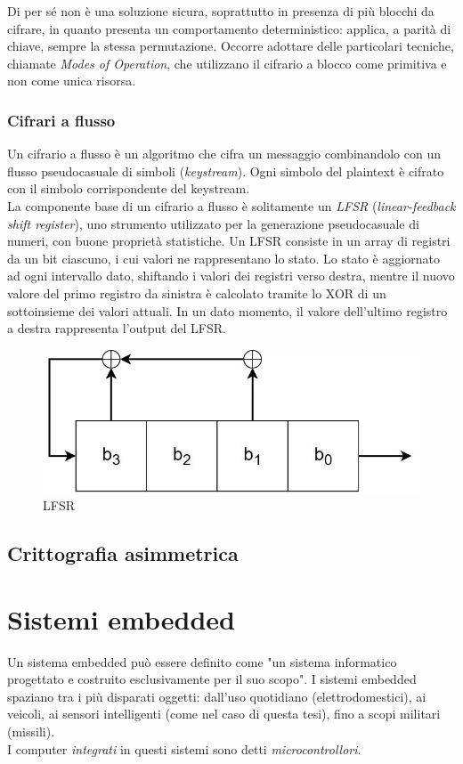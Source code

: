 \documentclass[target=bach,aauheader=,style=]{thud}
\begin{document}
            Di per sé non è una soluzione sicura, soprattutto in presenza di più blocchi da cifrare, in quanto presenta un comportamento deterministico: applica, a parità di chiave, sempre la stessa permutazione. Occorre adottare delle particolari tecniche, chiamate \textit{Modes of Operation}, che utilizzano il cifrario a blocco come primitiva e non come unica risorsa. \cite{handcypto, computernet}
            
            \subsubsection{Cifrari a flusso}
            Un cifrario a flusso è un algoritmo che cifra un messaggio combinandolo con un flusso pseudocasuale di simboli (\textit{keystream}). Ogni simbolo del plaintext è cifrato con il simbolo corrispondente del keystream.\\
            La componente base di un cifrario a flusso è solitamente un \textit{LFSR} (\textit{linear-feedback shift register}), uno strumento utilizzato per la generazione pseudocasuale di numeri, con buone proprietà statistiche. Un LFSR consiste in un array di registri da un bit ciascuno, i cui valori ne rappresentano lo stato. Lo stato è aggiornato ad ogni intervallo dato, shiftando i valori dei registri verso destra, mentre il nuovo valore del primo registro da sinistra è calcolato tramite lo XOR di un sottoinsieme dei valori attuali. In un dato momento, il valore dell'ultimo registro a destra rappresenta l'output del LFSR.\cite{moderncrypto}
            \begin{figure}[htbp]
                \centering
                \includegraphics[width=0.5\linewidth]{img/lfsr.jpg}
                \caption{LFSR}
                \label{fig:placeholder}
            \end{figure}
        \subsection{Crittografia asimmetrica}

    \section{Sistemi embedded}
    Un sistema embedded può essere definito come "un sistema informatico progettato e costruito esclusivamente per il suo scopo"\cite{embeddedsys}.
    I sistemi embedded spaziano tra i più disparati oggetti: dall'uso quotidiano (elettrodomestici), ai veicoli, ai sensori intelligenti (come nel caso di questa tesi), fino a scopi militari (missili).\\
    I computer \textit{integrati} in questi sistemi sono detti \textit{microcontrollori}\cite{architetture}.
    
\end{document}
